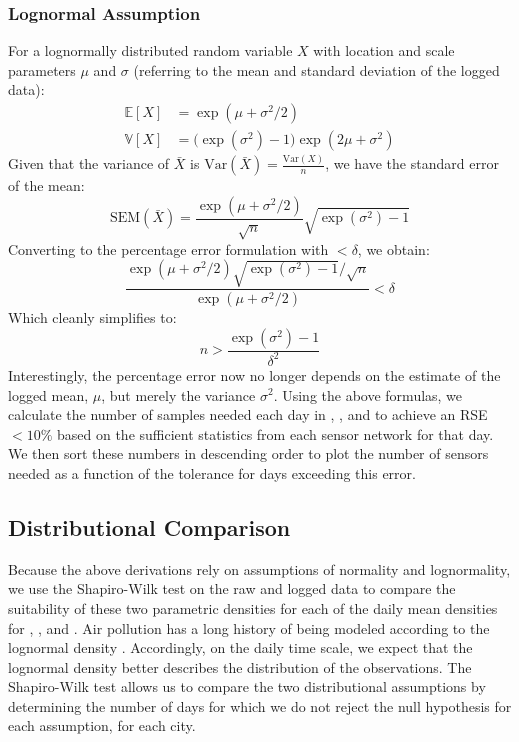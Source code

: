 \subsubsection{Lognormal Assumption}
\label{sec:si_rse_lognormal}

For a lognormally distributed random variable $X$ with location and scale parameters $\mu$ and $\sigma$ (referring to the mean and standard deviation of the logged data):
\begin{align}
 \mathbb{E}[X] &= \exp(\mu + \sigma^2 / 2) \\
 \mathbb{V}[X] &=\big(\exp(\sigma^2) -1\big)\exp(2\mu+\sigma^2)
\end{align}
Given that the variance of $\bar{X}$ is $\text{Var}(\bar{X}) = \frac{\text{Var}(X)}{n}$, we have the standard error of the mean:
\begin{equation}
 \text{SEM}(\bar{X}) = \frac{\exp(\mu + \sigma^2/2)}{\sqrt{n}}\sqrt{\exp(\sigma^2)-1}
\end{equation}
Converting to the percentage error formulation with $<\delta$, we obtain:
\begin{equation}
 \frac{\exp(\mu + \sigma^2/2)\sqrt{\exp(\sigma^2)-1}/\sqrt{n}}{\exp(\mu + \sigma^2 / 2)} < \delta
\end{equation}
Which cleanly simplifies to:
\begin{equation}
 n > \frac{\exp(\sigma^2) - 1}{\delta^2}
\end{equation}
Interestingly, the percentage error now no longer depends on the estimate of the logged mean, $\mu$, but merely the variance $\sigma^2$. Using the above formulas, we calculate the number of samples needed each day in , , and  to achieve an RSE $<10\%$ based on the sufficient statistics from each sensor network for that day. We then sort these numbers in descending order to plot the number of sensors needed as a function of the tolerance for days exceeding this error.



\subsection{Distributional Comparison}
\label{sec:si_distributional}

Because the above derivations rely on assumptions of normality and lognormality, we use the Shapiro-Wilk test on the raw and logged data to compare the suitability of these two parametric densities for each of the daily mean densities for , , and  \cite{shapiro_1965_AnalysisVarianceTest}. Air pollution has a long history of being modeled according to the lognormal density \cite{kahn_1973_NoteDistributionAir,ott_1990_PhysicalExplanationLognormality,andersson_2021_MechanismsLogNormala,bencala_1976_FrequencyDistributionsAir}. Accordingly, on the daily time scale, we expect that the lognormal density better describes the distribution of the observations. The Shapiro-Wilk test allows us to compare the two distributional assumptions by determining the number of days for which we do not reject the null hypothesis for each assumption, for each city.
